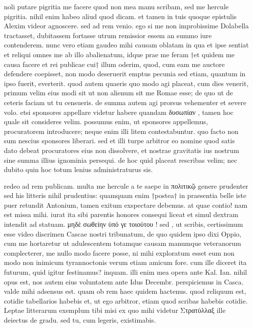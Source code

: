 


 noli putare pigritia me facere quod non mea manu scribam, sed me hercule pigritia. nihil enim habeo aliud quod dicam. et tamen in tuis quoque epistulis Alexim videor agnoscere. sed ad rem venio. ego si me non improbissime Dolabella tractasset, dubitassem fortasse utrum remissior essem an summo iure contenderem. nunc vero etiam gaudeo mihi causam oblatam in qua et ipse sentiat et reliqui omnes me ab illo abalienatum, idque prae me feram †et quidem me causa facere et rei publicae cui† illum oderim, quod, cum eam me auctore defendere coepisset, non modo deseruerit emptus pecunia sed etiam, quantum in ipso fuerit, everterit. quod autem quaeris quo modo agi placeat, cum dies venerit, primum velim eius modi sit ut non alienum sit me Romae esse; de quo ut de ceteris faciam ut tu censueris. de summa autem agi prorsus vehementer et severe volo. etsi sponsores appellare videtur habere quandam δυσωπίαν , tamen hoc quale sit consideres velim. possumus enim, ut sponsores appellemus, procuratorem introducere; neque enim illi litem contestabuntur. quo facto non sum nescius sponsores liberari. sed et illi turpe arbitror eo nomine quod satis dato debeat procuratores eius non dissolvere, et nostrae gravitatis ius nostrum sine summa illius ignominia persequi. de hoc quid placeat rescribas velim; nec dubito quin hoc totum lenius administraturus sis.

 redeo ad rem publicam. multa me hercule a te saepe in πολιτικῷ genere prudenter sed his litteris nihil prudentius: quamquam enim †postea† in praesentia belle iste puer retundit Antonium, tamen exitum exspectare debemus. at quae contio! nam est missa mihi. iurat ita sibi parentis honores consequi liceat et simul dextram intendit ad statuam. μηδὲ σωθείην ὑπό γε τοιούτου ! sed , ut scribis, certissimum esse video discrimen Cascae nostri tribunatum, de quo quidem ipso dixi Oppio, cum me hortaretur ut adulescentem totamque causam manumque veteranorum complecterer, me nullo modo facere posse, ni mihi exploratum esset eum non modo non inimicum tyrannoctonis verum etiam amicum fore. cum ille diceret ita futurum, quid igitur festinamus? inquam. illi enim mea opera ante Kal. Ian. nihil opus est, nos autem eius voluntatem ante Idus Decembr. perspiciemus in Casca. valde mihi adsensus est. quam ob rem haec quidem hactenus. quod reliquum est, cotidie tabellarios habebis et, ut ego arbitror, etiam quod scribas habebis cotidie. Leptae litterarum exemplum tibi misi ex quo mihi videtur Στρατύλλαξ ille deiectus de gradu. sed tu, cum legeris, existimabis.

